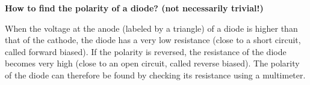 \begin{enumerate}
\begin{itemize}
  \end{itemize}

  \begin{comment}
  {\bf Solution:}
  
  \begin{itemize}
  \item Calibration:

    The resistance of the meter-head $R_m$ in parallel with R26 is:
    \[
    R_m||R26=2||31=1.88\;k\Omega
    \]
    When $R=0$, the total load of the 3V battery is 
    \[
    R_t=44+(18+x)||(10-x+1.88)=44+\frac{(18+x)(11.88-x)}{(18+x)+(11.88-x)}
    =\frac{1528.5-6.12\;x-x^2}{29.88}
    \]
    The total current through the 3V battery is:
    \[
    I_t=\frac{3V}{R_t}=\frac{3\times 29.88}{1528.5-6.12\;x-x^2}
    \]
    The current through the meter in parallel with R26 needs to be 0.05 $\mu A$:
    \[
    I_m=I_t\;\frac{18+x}{29.88}
    =\frac{3\times 29.88}{1528.5-6.12\;x-x^2}\;\frac{18+x}{29.88}
    =\frac{3(18+x)}{1528.5-6.12\;x-x^2}=0.05
    \]
    Solving for a positive value of $x$ we get $x=6.2\;k\Omega$. Now we have
    $18+x=24.2$, $10-x=3.8$. 

    The total resistance is
    \[
    R_t=\frac{1528.5-6.12\;x-x^2}{29.88}=48.6\;k\Omega
    \]
    and the total current is
    \[
    I_t=\frac{3}{R_t}=\frac{3}{48.6}=0.0617
    \]

    \htmladdimg{../multimeter2a.png}

  \item $\times 1\;k\Omega$ scale, $R=20\;k\Omega$
  
    The total current through the battery is
    \[
    \frac{3}{R+R19||R_t}
    \]
    The current through $R23=44\;k\Omega$ (current divider) need to be $I_t/2$    
    \[
    \frac{3}{R+R19||R_t}\;\frac{R19}{R19+R_t}=\frac{I_t}{2}
    \]
    Substituting $R=20\;k\Omega$, $R_t=48.6\;k\Omega$ and $I_t=0.0617\;mA$, 
    and solving for $R19$ we get $R19=33.96\approx 34\;k\Omega$.    
  \end{comment}

\end{enumerate}






{\bf How to find the polarity of a diode? (not necessarily trivial!)}

When the voltage at the anode (labeled by a triangle) of a diode is higher
than that of the cathode, the diode has a very low resistance (close to a short
circuit, called forward biased). If the polarity is reversed, the resistance 
of the diode becomes very high (close to an open circuit, called reverse biased).
The polarity of the diode can therefore be found by checking its resistance 
using a multimeter.

